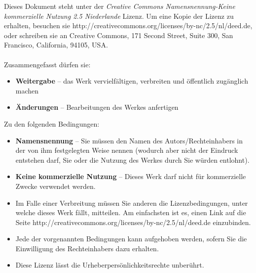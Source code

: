 \clearemptydoublepage
\noindent\thispagestyle{empty}
Dieses Dokument steht unter der \emph{Creative Commons Namensnennung-Keine kommerzielle Nutzung 2.5 Niederlande} Lizenz. Um eine Kopie der Lizenz zu erhalten, besuchen sie http://creativecommons.org/licenses/by-nc/2.5/nl/deed.de, oder schreiben sie an Creative Commons, 171 Second Street, Suite 300, San Francisco, California, 94105, USA.\\\\
Zusammengefasst dürfen sie:
  \begin{itemize}
    \item \textbf{Weitergabe} -- das Werk vervielfältigen, verbreiten und öffentlich zugänglich machen
    \item \textbf{Änderungen} -- Bearbeitungen des Werkes anfertigen
  \end{itemize}
  Zu den folgenden Bedingungen:
  \begin{itemize}
    \item \textbf{Namensnennung} -- Sie müssen den Namen des Autors/Rechteinhabers in der von ihm festgelegten Weise nennen (wodurch aber nicht der Eindruck entstehen darf, Sie oder die Nutzung des Werkes durch Sie würden entlohnt).
    \item \textbf{Keine kommerzielle Nutzung} -- Dieses Werk darf nicht für kommerzielle Zwecke verwendet werden.
    \item Im Falle einer Verbreitung müssen Sie anderen die Lizenzbedingungen, unter welche dieses Werk fällt, mitteilen. Am einfachsten ist es, einen Link auf die Seite http://creativecommons.org/licenses/by-nc/2.5/nl/deed.de einzubinden.
    \item Jede der vorgenannten Bedingungen kann aufgehoben werden, sofern Sie die Einwilligung des Rechteinhabers dazu erhalten.
    \item Diese Lizenz lässt die Urheberpersönlichkeitsrechte unberührt.
  \end{itemize}
\normalsize


\clearemptydoublepage

